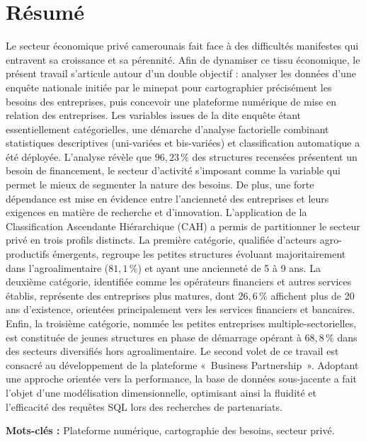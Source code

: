\documentclass[12pt, a4paper, oneside]{report}
\begin{document}
\chapter*{Résumé}
\thispagestyle{plain}
Le secteur économique privé camerounais fait face à des difficultés manifestes qui entravent sa croissance et sa pérennité. Afin de dynamiser ce tissu économique, le présent travail s'articule autour d'un double objectif : analyser les données d'une enquête nationale initiée par le \gls{minepat} pour cartographier précisément les besoins des entreprises, puis concevoir une plateforme numérique de mise en relation des entreprises. Les variables issues de la dite enqu\^ete étant essentiellement catégorielles, une démarche d'analyse factorielle combinant statistiques descriptives (uni-variées et bis-variées) et classification automatique a été déployée. L'analyse révèle que $96{,}23\,\%$ des structures recensées présentent un besoin de financement, le secteur d'activité s'imposant comme la variable qui permet le mieux de segmenter la nature des besoins. De plus, une forte dépendance est mise en évidence entre l'ancienneté des entreprises et leurs exigences en matière de recherche et d'innovation. L'application de la Classification Ascendante Hiérarchique (CAH) a permis de partitionner le secteur privé en trois profils distincts. La première catégorie, qualifiée d'acteurs agro-productifs émergents, regroupe les petites structures évoluant majoritairement dans l'agroalimentaire ($81{,}1\,\%$) et ayant une ancienneté de 5 à 9 ans. La deuxième catégorie, identifiée comme les opérateurs financiers et autres services établis, représente des entreprises plus matures, dont $26{,}6\,\%$ affichent plus de 20 ans d'existence, orientées principalement vers les services financiers et bancaires. Enfin, la troisième catégorie, nommée les petites entreprises multiple-sectorielles, est constituée de jeunes structures en phase de démarrage opérant à $68{,}8\,\%$ dans des secteurs diversifiés hors agroalimentaire. Le second volet de ce travail est consacré au développement de la plateforme «~Business Partnership~». Adoptant une approche orientée vers la performance, la base de données sous-jacente a fait l'objet d'une modélisation dimensionnelle, optimisant ainsi la fluidité et l'efficacité des requêtes SQL lors des recherches de partenariats.

\vspace{0.5cm}
\noindent \textbf{Mots-clés :} Plateforme numérique, cartographie des besoins,  secteur privé.
	
\end{document}
